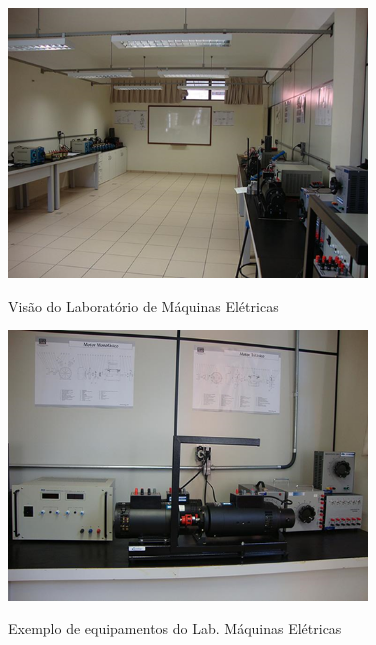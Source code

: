 \begin{figure}[!htb]
    \centering
    \caption{Visão do Laboratório de Máquinas Elétricas}
    \includegraphics[width=0.85\textwidth]{Caps/Figs/lab005.01a.png}
    \fonte{\utf}
    \label{fig:lab005.01a}
\end{figure}

\begin{figure}[!htb]
    \centering
    \caption{Exemplo de equipamentos do Lab. Máquinas Elétricas}
    \includegraphics[width=0.85\textwidth]{Caps/Figs/lab005.01b.png}
    \fonte{\utf}
    \label{fig:lab005.01b}
\end{figure}

